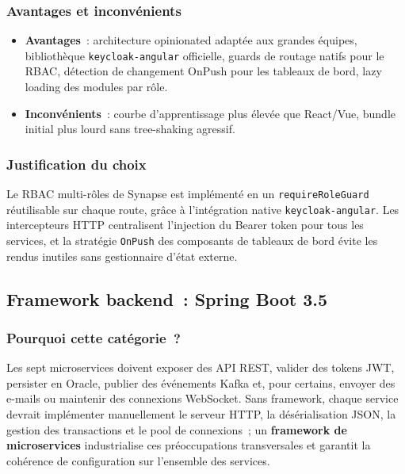 \subsubsection*{Avantages et inconvénients}

\begin{itemize}[leftmargin=*,nosep]
  \item \textbf{Avantages}~: architecture opinionated adaptée aux grandes équipes,
        bibliothèque \texttt{keycloak-angular} officielle, guards de routage natifs
        pour le RBAC, détection de changement OnPush pour les tableaux de bord, lazy
        loading des modules par rôle.
  \item \textbf{Inconvénients}~: courbe d'apprentissage plus élevée que React/Vue,
        bundle initial plus lourd sans tree-shaking agressif.
\end{itemize}

\subsubsection*{Justification du choix}

Le RBAC multi-rôles de Synapse est implémenté en un \texttt{requireRoleGuard} réutilisable sur chaque route, grâce à l'intégration native \texttt{keycloak-angular}. Les intercepteurs HTTP centralisent l'injection du Bearer token pour tous les services, et la stratégie \texttt{OnPush} des composants de tableaux de bord évite les rendus inutiles sans gestionnaire d'état externe.

\subsection{Framework backend~: Spring Boot 3.5}

\subsubsection*{Pourquoi cette catégorie~?}

Les sept microservices doivent exposer des API REST, valider des tokens JWT, persister en Oracle, publier des événements Kafka et, pour certains, envoyer des e-mails ou maintenir des connexions WebSocket. Sans framework, chaque service devrait implémenter manuellement le serveur HTTP, la désérialisation JSON, la gestion des transactions et le pool de connexions~; un \textbf{framework de microservices} industrialise ces préoccupations transversales et garantit la cohérence de configuration sur l'ensemble des services.

